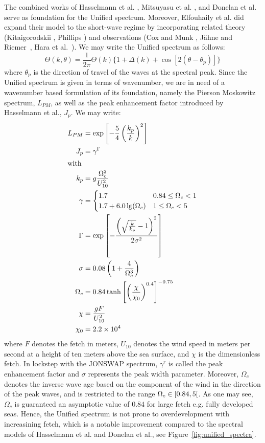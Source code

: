 The combined works of Hasselmann et al. \cite{article:Hasselman1973}, Mitsuyasu 
et al. \cite{article:Mitsuyasu1975}, and Donelan et al. 
\cite{article:Donelan1985} serve as foundation for the Unified spectrum. 
Moreover, Elfouhaily et al. did expand their model to the short-wave regime by 
incorporating related theory (Kitaigorodskii \cite{book:Kitaigorodskii1970}, 
Phillips \cite{article:Phillips1985}) and observations (Cox and Munk 
\cite{article:CoxMunk1954}, Jähne and Riemer~\cite{article:Jaehne1990a}, Hara et 
al.~\cite{article:Hara1994}). We may write the Unified spectrum as follows:
%
\begin{equation}
 \Theta(k, \theta) = \frac{1}{2\pi}\Theta(k)\{1 + \Delta(k) + \cos[2(\theta - 
\theta_p)]\}
\end{equation}
%
where $\theta_p$ is the direction of travel of the waves at the spectral peak. 
Since the Unified spectrum is given in terms of wavenumber, we are in need of a 
wavenumber based formulation of its foundation, namely the Pierson Moskowitz 
spectrum, $L_{PM}$, as well as the peak enhancement factor introduced by 
Hasselmann et al., $J_p$. We may write:
%
\begin{subequations}
\begin{align}
L_{PM} &= \exp\left[-\frac{5}{4} \left(\frac{k_p}{k}\right)^2 \right] \\
J_p &= \gamma^{\Gamma} \\
\intertext{with}
k_p &= g\frac{\Omega_c^2}{U_{10}^2} \\
\gamma &= \begin{cases}
	1.7 & 0.84 \leq \Omega_c < 1 \\
	1.7 + 6.0\lg(\Omega_c) & 1\leq\Omega_c < 5
	\end{cases} \\
\Gamma &= \exp\left[-
\frac{\left(\sqrt{\frac{k}{k_p}}-1\right)^2}{2\sigma^2}\right] \\
\sigma &= 0.08\left(1 + \frac{4}{\Omega_c^3}\right) \\
\Omega_c &= 0.84 
\tanh\left[\left(\frac{\chi}{\chi_0}\right)^{0.4}\right]^{-0.75} \\
\chi &= \frac{gF}{U_{10}^{2}} \\
\chi_0 &= 2.2 \times 10^4
\end{align}
\end{subequations}
%
where $F$ denotes the fetch in meters, $U_{10}$ denotes the wind speed in 
meters per second at a height of ten meters above the sea surface, and $\chi$ 
is the dimensionless fetch. In lockstep with the JONSWAP spectrum, $\gamma^r$ is 
called the peak enhancement factor and $\sigma$ represents the peak width 
parameter. Moreover, $\Omega_c$ denotes the inverse wave age based on the 
component of the wind in the direction of the peak waves, and is restricted to 
the range $\Omega_c \in \interval[open right]{0.84}{5}$. As one may see, 
$\Omega_c$ is guaranteed an asymptotic value of $0.84$ for large fetch e.g. 
fully developed seas. Hence, the Unified spectrum is not prone to 
overdevelopment with increasining fetch, which is a notable improvement 
compared to the spectral models of Hasselmann et al. and Donelan et al., see 
Figure~\ref{fig:unified_spectra}.

